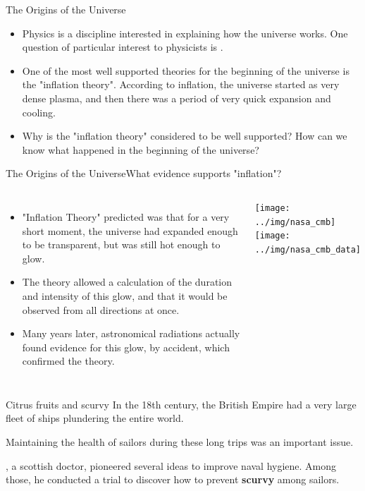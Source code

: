 \begin{frame}{The Origins of the Universe}
  \begin{itemize}
    \item Physics is a discipline interested in explaining how the universe works. One question of particular interest to physicists is .\bigskip

    \item One of the most well supported theories for the beginning of the universe is the "inflation theory". According to inflation, the universe started as very dense plasma, and then there was a period of very quick expansion and cooling.\bigskip

    \item Why is the "inflation theory" considered to be well supported? How can we know what happened in the beginning of the universe?
  \end{itemize}
\end{frame}

\begin{frame}{The Origins of the Universe}{What evidence supports "inflation"?}

  \begin{columns}

    \begin{itemize}
      \item "Inflation Theory" predicted was that for a very short moment,  the universe had expanded enough to be transparent, but was still hot enough to glow.\medskip

      \item The theory allowed a calculation of the duration and intensity of this glow, and that it would be observed from all directions at once.\medskip

      \item Many years later, astronomical radiations actually found evidence for this glow, by accident, which confirmed the theory.\medskip
    \end{itemize}

    \texttt{[image: ../img/nasa\_cmb]}
    \texttt{[image: ../img/nasa\_cmb\_data]}\\

  \end{columns}
\end{frame}

\begin{frame}{Citrus fruits and scurvy}
  In the 18th century, the British Empire had a very large fleet of ships plundering the entire world.\bigskip

  Maintaining the health of sailors during these long trips was an important issue.\bigskip

  , a scottish doctor, pioneered several ideas to improve naval hygiene. Among those, he conducted a trial to discover how to prevent {\bf scurvy} among sailors.
\end{frame}

